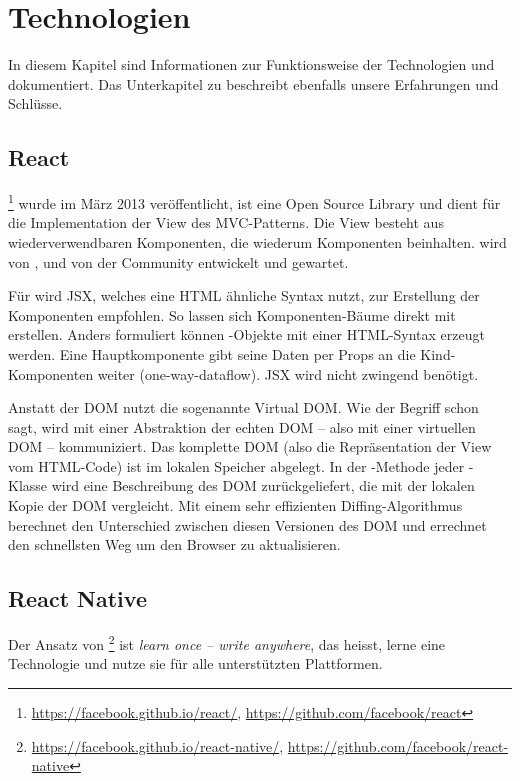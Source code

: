 \chapter{Technologien}
\label{pd-technologien}
In diesem Kapitel sind Informationen zur Funktionsweise der Technologien  und  dokumentiert. 
Das Unterkapitel zu  beschreibt ebenfalls unsere Erfahrungen und Schlüsse.


\section{React} 
\footnote{\url{https://facebook.github.io/react/}, \url{https://github.com/facebook/react}} wurde im März 2013 veröffentlicht\cite{react-release}, ist eine Open Source  \gls{Library} und dient für die Implementation der View des \gls{MVC}-Patterns. 
Die View besteht aus wiederverwendbaren Komponenten, die wiederum Komponenten beinhalten.
 wird von ,  und von der Community entwickelt und gewartet.\cite{react}

Für  wird \gls{JSX}, welches eine HTML ähnliche Syntax nutzt, zur Erstellung der Komponenten empfohlen. 
So lassen sich Komponenten-Bäume direkt mit  erstellen. 
Anders formuliert können -Objekte mit einer HTML-Syntax erzeugt werden. 
Eine Hauptkomponente gibt seine Daten per Props an die Kind-Komponenten weiter (one-way-dataflow).\cite{react-data-flow}
\gls{JSX} wird nicht zwingend benötigt.\cite{jsx-syntax}

Anstatt der \gls{DOM} nutzt  die sogenannte \gls{Virtual DOM}.
Wie der Begriff schon sagt, wird mit einer Abstraktion der echten \gls{DOM} -- also mit einer virtuellen DOM -- kommuniziert.
Das komplette \gls{DOM} (also die Repräsentation der View vom HTML-Code) ist im lokalen Speicher abgelegt.\cite{virtual-dom}
In der -Methode jeder -Klasse wird eine Beschreibung des DOM zurückgeliefert, die  mit der lokalen Kopie der \gls{DOM} vergleicht.
Mit einem sehr effizienten Diffing-Algorithmus berechnet  den Unterschied zwischen diesen  Versionen des \gls{DOM} und errechnet den schnellsten Weg um den Browser zu aktualisieren.\cite{react-virtual-dom}


\section{React Native}
Der Ansatz von \footnote{\url{https://facebook.github.io/react-native/}, \url{https://github.com/facebook/react-native}} ist \textit{learn once -- write anywhere}, das heisst, lerne eine Technologie und nutze sie für alle unterstützten Plattformen.\cite{react-native}

